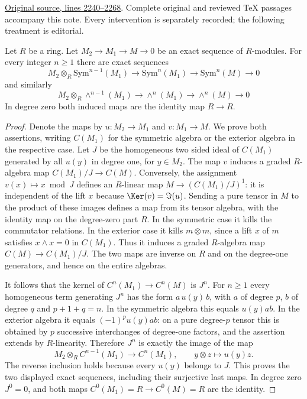\hypertarget{algebra-context-008}{}

\noindent\href{https://github.com/stacks/stacks-project/blob/a04446e57ec1fbc252a871afcec7752fb2807b14/algebra.tex\#L2240}{Original source, lines 2240--2268}. Complete original and reviewed TeX passages accompany this note. Every intervention is separately recorded; the following treatment is editorial.


\begin{lemma}
\label{editorial-source-lemma-presentation-sym-exterior}
Let $R$ be a ring.
Let $M_2 \to M_1 \to M \to 0$ be an exact sequence of $R$-modules.
For every integer $n \geq 1$ there are exact sequences
$$
M_2 \otimes_R \text{Sym}^{n - 1}(M_1)
\to
\text{Sym}^n(M_1)
\to
\text{Sym}^n(M)
\to
0
$$
and similarly
$$
M_2 \otimes_R \wedge^{n - 1}(M_1)
\to
\wedge^n(M_1)
\to
\wedge^n(M)
\to
0
$$
In degree zero both induced maps are the identity map $R \to R$.
\end{lemma}

\begin{proof}
Denote the maps by $u : M_2 \to M_1$ and $v : M_1 \to M$.
We prove both assertions, writing $C(M_1)$ for the symmetric algebra
or the exterior algebra in the respective case. Let $J$ be the
homogeneous two sided ideal of $C(M_1)$ generated by all
$u(y)$ in degree one, for $y \in M_2$.
The map $v$ induces a graded $R$-algebra map
$C(M_1)/J \to C(M)$. Conversely, the assignment
$v(x) \mapsto x \bmod J$ defines an $R$-linear map
$M \to (C(M_1)/J)^1$: it is independent of the lift $x$
because $\Ker(v) = \Im(u)$. Sending a pure tensor in $M$
to the product of these images defines a map from its tensor algebra,
with the identity map on the degree-zero part $R$.
In the symmetric case it kills the commutator relations.
In the exterior case it kills $m\otimes m$, since a lift $x$ of $m$
satisfies $x\wedge x = 0$ in $C(M_1)$.
Thus it induces a graded $R$-algebra map
$C(M) \to C(M_1)/J$. The two maps are inverse on $R$ and on
the degree-one generators, and hence on the entire algebras.

\medskip\noindent
It follows that the kernel of $C^n(M_1) \to C^n(M)$ is $J^n$.
For $n \geq 1$ every homogeneous term generating $J^n$ has the form
$a\,u(y)\,b$, with $a$ of degree $p$, $b$ of degree $q$ and
$p+1+q=n$. In the symmetric algebra this equals $u(y)ab$.
In the exterior algebra it equals $(-1)^p u(y)ab$:
on a pure degree-$p$ tensor this is obtained by $p$ successive
interchanges of degree-one factors, and the assertion extends by
$R$-linearity. Therefore $J^n$ is exactly the image of the map
$$
M_2\otimes_R C^{n-1}(M_1) \longrightarrow C^n(M_1),
\qquad y\otimes z \longmapsto u(y)z.
$$
The reverse inclusion holds because every $u(y)$ belongs to $J$.
This proves the two displayed exact sequences, including their
surjective last maps. In degree zero $J^0=0$, and both maps
$C^0(M_1)=R \to C^0(M)=R$ are the identity.
\end{proof}



